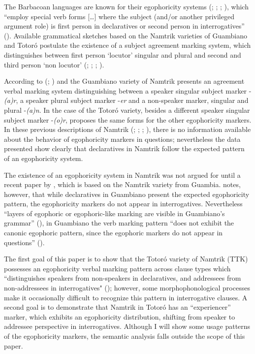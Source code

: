\documentclass[output=paper]{langsci/langscibook}
\begin{document}
The Barbacoan languages are known for their egophoricity systems (\citealt{Dickinson2000}; \citealt{Curnow2002a}; \citealt{CurnowLiddicoat1998}; \citealt{Floyd2018}), which “employ special verb forms […] where the subject (and/or another privileged argument role) is first person in declaratives or second person in interrogatives” (\citealt{SanRoque2018}). Available grammatical sketches based on the Namtrik varieties of Guambiano and Totoró postulate the existence of a subject agreement marking system, which distinguishes between first person ‘locutor’ singular and plural and second and third person ‘non locutor’ (\citealt{Pabon1989}; \citealt{TrivinoGarzon1989}; \citealt{Vasquez1987}; \citealt{Vasquez1988}). 


According to \citeauthor{Vasquez1987} (\citealt{Vasquez1987}; \citealt{Vasquez1988}) and \citet{TrivinoGarzon1989} the Guambiano variety of Namtrik presents an agreement verbal marking system distinguishing between a speaker singular subject marker -\textit{(a)r}, a speaker plural subject marker -\textit{er} and a non-speaker marker, singular and plural -\textit{(a)n}. In the case of the Totoró variety, besides a different speaker singular subject marker -\textit{(o)r}, \citet{Pabon1989} proposes the same forms for the other egophoricity markers. In these previous descriptions of Namtrik (\citealt{Pabon1989}; \citealt{TrivinoGarzon1989}; \citealt{Vasquez1987}; \citealt{Vasquez1988}), there is no information available about the behavior of egophoricity markers in questions; nevertheless the data presented show clearly that declaratives in Namtrik follow the expected pattern of an egophoricity system.

The existence of an egophoricity system in Namtrik was not argued for until a recent paper by \citet{Norcliffe2018}, which is based on the Namtrik variety from Guambia. \citet{Norcliffe2018} notes, however, that while declaratives in Guambiano present the expected egophoricity pattern, the egophoricity markers do not appear in interrogatives. Nevertheless “layers of egophoric or egophoric-like marking are visible in Guambiano’s grammar” (\citealt{Norcliffe2018}), in Guambiano the verb marking pattern “does not exhibit the canonic egophoric pattern, since the egophoric markers do not appear in questions” (\citealt{Norcliffe2018}).

The first goal of this paper is to show that the Totoró variety of Namtrik (TTK) possesses an egophoricity verbal marking pattern across clause types which “distinguishes speakers from non-speakers in declaratives, and addressees from non-addressees in interrogatives" (\citealt[1]{Creissels2008}); however, some morphophonological processes make it occasionally difficult to recognize this pattern in interrogative clauses. A second goal is to demonstrate that Namtrik in Totoró has an “experiencer” marker, which exhibits an egophoricity distribution, shifting from speaker to addressee perspective in interrogatives. Although I will show some usage patterns of the egophoricity markers, the semantic analysis falls outside the scope of this paper.
\end{document}
